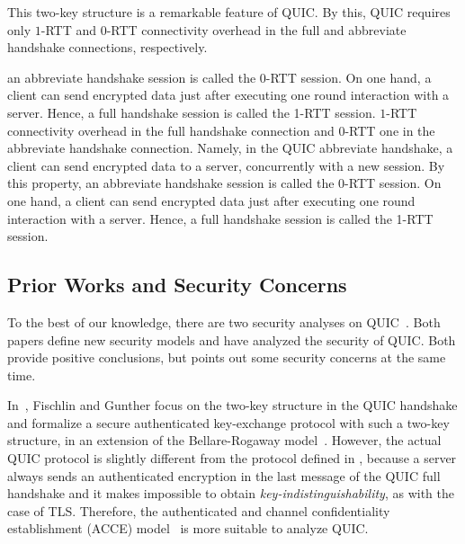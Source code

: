This two-key structure is a remarkable feature of QUIC.
By this, QUIC requires only  $1$-RTT and $0$-RTT connectivity overhead in the full and
abbreviate handshake connections, respectively.


%
an abbreviate handshake session is called
the 0-RTT session. On one hand,
a client can send encrypted data just after executing one round interaction with a server.
Hence, a full handshake session is called the 1-RTT session.
$1$-RTT connectivity overhead in the full handshake connection and
$0$-RTT one in the abbreviate handshake connection.
Namely, in the QUIC abbreviate handshake, a client can send
encrypted data to a server, concurrently with a new session.
By this property, an abbreviate handshake session is called
the 0-RTT session. On one hand,
a client can send encrypted data just after executing one round interaction with a server.
Hence, a full handshake session is called the 1-RTT session.
\fi
\subsection{Prior Works and Security Concerns} \label{sec:concern}
To the best of our knowledge, there are two security analyses on QUIC~\cite{FG14:QUIC,LJBN15:QUIC}.
Both papers define new security models and have analyzed the security of QUIC.
Both provide positive conclusions, but
\cite{LJBN15:QUIC} points out some security concerns at the same time.

In~\cite{FG14:QUIC}, Fischlin and Gunther focus on the two-key structure in the QUIC handshake
and formalize a secure authenticated key-exchange protocol with such a two-key structure,
in an extension  of the Bellare-Rogaway model~\cite{BR93:AKE}.
However, the actual QUIC protocol is slightly different from the protocol defined in \cite{FG14:QUIC},
because a server always sends an authenticated encryption in the last message of
the QUIC full handshake and
it makes impossible to obtain \textit{key-indistinguishability}, as with the case of TLS.
Therefore, the authenticated and channel confidentiality
establishment (ACCE) model~\cite{JKSS12:ACCE} is more
suitable to analyze QUIC.

